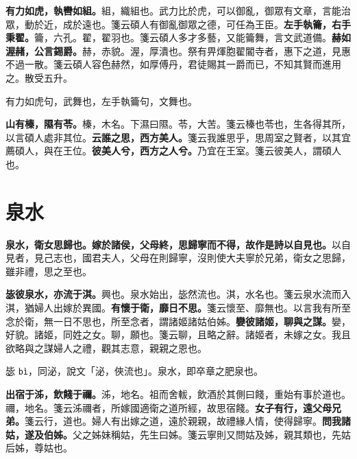 \textbf{有力如虎，執轡如組。}{\footnotesize 組，織組也。武力比於虎，可以御亂，御眾有文章，言能治眾，動於近，成於遠也。箋云碩人有御亂御眾之德，可任為王臣。}\textbf{左手執籥，右手秉翟。}{\footnotesize 籥，六孔。翟，翟羽也。箋云碩人多才多藝，又能籥舞，言文武道備。}\textbf{赫如渥赭，公言錫爵。}{\footnotesize 赫，赤貌。渥，厚潰也。祭有畀煇胞翟閽寺者，惠下之道，見惠不過一散。箋云碩人容色赫然，如厚傅丹，君徒賜其一爵而已，不知其賢而進用之。散受五升。}

\begin{quoting}有力如虎句，武舞也，左手執籥句，文舞也。\end{quoting}

\textbf{山有榛，隰有苓。}{\footnotesize 榛，木名。下濕曰隰。苓，大苦。箋云榛也苓也，生各得其所，以言碩人處非其位。}\textbf{云誰之思，西方美人。}{\footnotesize 箋云我誰思乎，思周室之賢者，以其宜薦碩人，與在王位。}\textbf{彼美人兮，西方之人兮。}{\footnotesize 乃宜在王室。箋云彼美人，謂碩人也。}

\section{泉水}


\textbf{泉水，衛女思歸也。嫁於諸侯，父母終，思歸寧而不得，故作是詩以自見也。}{\footnotesize 以自見者，見己志也，國君夫人，父母在則歸寧，沒則使大夫寧於兄弟，衛女之思歸，雖非禮，思之至也。}

\textbf{毖彼泉水，亦流于淇。}{\footnotesize 興也。泉水始出，毖然流也。淇，水名也。箋云泉水流而入淇，猶婦人出嫁於異國。}\textbf{有懷于衛，靡日不思。}{\footnotesize 箋云懷至、靡無也。以言我有所至念於衛，無一日不思也，所至念者，謂諸姬諸姑伯姊。}\textbf{孌彼諸姬，聊與之謀。}{\footnotesize 孌，好貌。諸姬，同姓之女。聊，願也。箋云聊，且略之辭。諸姬者，未嫁之女。我且欲略與之謀婦人之禮，觀其志意，親親之恩也。}

\begin{quoting}毖 \texttt{bì}，同泌，說文「泌，俠流也」。泉水，即卒章之肥泉也。\end{quoting}

\textbf{出宿于泲，飲餞于禰。}{\footnotesize 泲，地名。祖而舍軷，飲酒於其側曰餞，重始有事於道也。禰，地名。箋云泲禰者，所嫁國適衛之道所經，故思宿餞。}\textbf{女子有行，遠父母兄弟。}{\footnotesize 箋云行，道也。婦人有出嫁之道，遠於親親，故禮緣人情，使得歸寧。}\textbf{問我諸姑，遂及伯姊。}{\footnotesize 父之姊妹稱姑，先生曰姊。箋云寧則又問姑及姊，親其類也，先姑后姊，尊姑也。}

